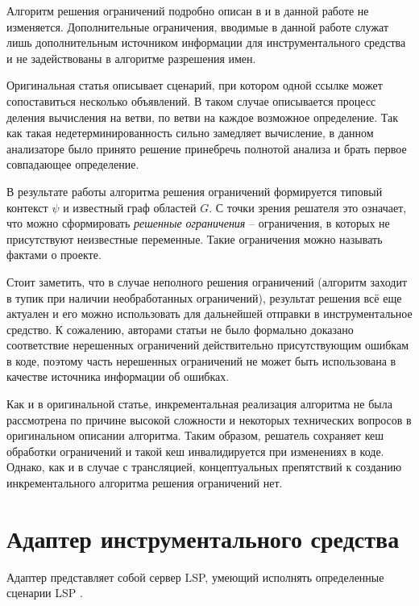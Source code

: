Алгоритм решения ограничений подробно описан в \cite{scope-graphs-static-analysis} и в данной работе не изменяется.
Дополнительные ограничения, вводимые в данной работе служат лишь дополнительным источником информации для
инструментального средства и не задействованы в алгоритме разрешения имен.

Оригинальная статья описывает сценарий, при котором одной ссылке может сопоставиться несколько объявлений.
В таком случае описывается процесс деления вычисления на ветви, по ветви на каждое возможное определение.
Так как такая недетерминированность сильно замедляет вычисление, в данном анализаторе было принято решение
принебречь полнотой анализа и брать первое совпадающее определение.

В результате работы алгоритма решения ограничений формируется типовый контекст $\psi$ и известный граф областей
$G$. С точки зрения решателя это означает, что можно сформировать \textit{решенные ограничения} -- ограничения,
в которых не присутствуют неизвестные переменные. Такие ограничения можно называть фактами о проекте.

Стоит заметить, что в случае неполного решения ограничений (алгоритм заходит в тупик при наличии необработанных ограничений),
результат решения всё еще актуален и его можно использовать для дальнейшей отправки в инструментальное средство.
К сожалению, авторами статьи не было формально доказано соответствие нерешенных ограничений действительно присутствующим
ошибкам в коде, поэтому часть нерешенных ограничений не может быть использована в качестве источника информации об ошибках.

Как и в оригинальной статье, инкрементальная реализация алгоритма не была рассмотрена по причине высокой сложности
и некоторых технических вопросов в оригинальном описании алгоритма. Таким образом, решатель сохраняет кеш
обработки ограничений и такой кеш инвалидируется при изменениях в коде. Однако, как и в случае с трансляцией,
концептуальных препятствий к созданию инкрементального алгоритма решения ограничений нет.

\section{Адаптер инструментального средства}

Адаптер представляет собой сервер LSP, умеющий исполнять определенные сценарии LSP \cite{lsp-usecases}.
